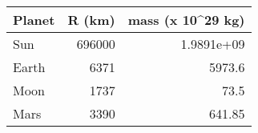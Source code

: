 \begin{tabular}{lrr}
\hline
 Planet   &   R (km) &   mass (x 10\^{}29 kg) \\
\hline
 Sun      &   696000 &          1.9891e+09 \\
 Earth    &     6371 &       5973.6        \\
 Moon     &     1737 &         73.5        \\
 Mars     &     3390 &        641.85       \\
\hline
\end{tabular}
